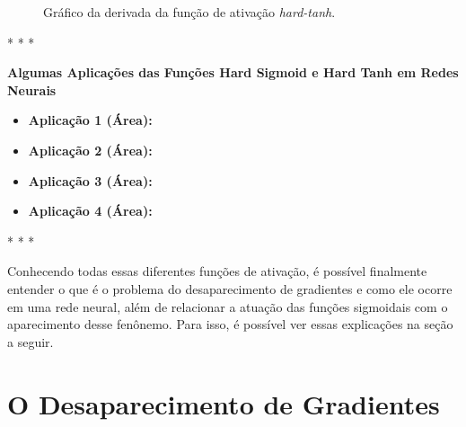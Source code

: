 \begin{figure}[h!]
    \centering
    \caption{Gráfico da derivada da função de ativação \textit{hard-tanh}.}
    \label{fig:hard-tanh-derivada}
\end{figure}

\medskip
\begin{center}
 * * *
\end{center}
\medskip

\textbf{Algumas Aplicações das Funções Hard Sigmoid e Hard Tanh em Redes Neurais}
\vspace{1em}

\begin{itemize}
    \item \textbf{Aplicação 1 (Área):}
    \item \textbf{Aplicação 2 (Área):}
    \item \textbf{Aplicação 3 (Área):}
    \item \textbf{Aplicação 4 (Área):}
\end{itemize}

\medskip
\begin{center}
 * * *
\end{center}
\medskip

Conhecendo todas essas diferentes funções de ativação, é possível finalmente entender o que é o problema do desaparecimento de gradientes e como ele ocorre em uma rede neural, além de relacionar a atuação das funções sigmoidais com o aparecimento desse fenônemo. Para isso, é possível ver essas explicações na seção a seguir.

\section{O Desaparecimento de Gradientes}

